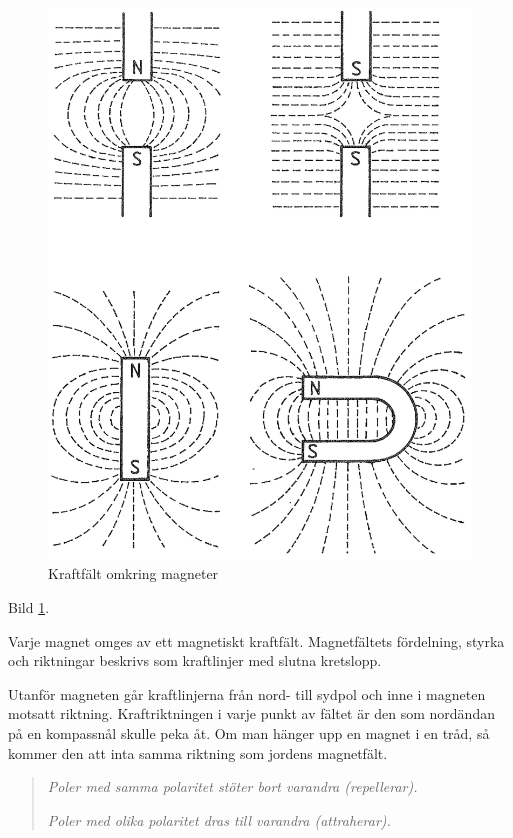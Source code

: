 \begin{figure}
  \includegraphics[width=\textwidth]{images/cropped_pdfs/bild_2_1-07.pdf}
  \caption{Kraftfält omkring magneter}
  \label{fig:BildII1-7}
\end{figure}

Bild \ref{fig:BildII1-7}.

Varje magnet omges av ett magnetiskt kraftfält. Magnetfältets fördelning,
styrka och riktningar beskrivs som kraftlinjer med slutna kretslopp.

Utanför magneten går kraftlinjerna från nord- till sydpol och inne i magneten 
motsatt riktning. Kraftriktningen i varje punkt av fältet är den som nordändan
på en kompassnål skulle peka åt. Om man hänger upp en magnet i en tråd, så
kommer den att inta samma riktning som jordens magnetfält.

\begin{quote}
\emph{Poler med samma polaritet stöter bort varandra (repellerar).}

\emph{Poler med olika polaritet dras till varandra (attraherar).}
\end{quote}

